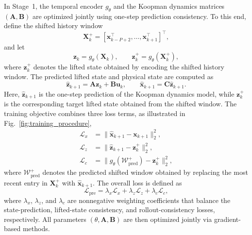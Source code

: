 \documentclass[journal]{IEEEtran}
\newcommand{\vx}{\mathbf{x}}
\newcommand{\vu}{\mathbf{u}}
\newcommand{\vz}{\mathbf{z}}
\newcommand{\mA}{\mathbf{A}}
\newcommand{\mB}{\mathbf{B}}
\newcommand{\mC}{\mathbf{C}}
\newcommand{\mX}{\mathbf{X}}
\begin{document}
In Stage~1, the temporal encoder $g_\theta$ and the Koopman dynamics matrices $(\mA,\mB)$ are optimized jointly using one-step prediction consistency. To this end, define the shifted history window
\begin{equation}
    \mX_k^{+} = [\vx_{k-P+2}^\top,\ldots,\vx_{k+1}^\top]^\top,
\end{equation}
and let
\begin{equation}
    \vz_k = g_\theta(\mX_k), \qquad
    \vz_k^{+} = g_\theta(\mX_k^{+}),
\end{equation}
where $\vz_k^{+}$ denotes the lifted state obtained by encoding the shifted history window. The predicted lifted state and physical state are computed as
\begin{equation}
    \hat{\vz}_{k+1} = \mA \vz_k + \mB \vu_k,
    \qquad
    \hat{\vx}_{k+1} = \mC \hat{\vz}_{k+1}.
\end{equation}
Here, $\hat{\vz}_{k+1}$ is the one-step prediction of the Koopman dynamics model, while $\vz_k^{+}$ is the corresponding target lifted state obtained from the shifted window. The training objective combines three loss terms, as illustrated in Fig.~\ref{fig:training_procedure},
\begin{align}
    \mathcal{L}_{x} &= \|\hat{\vx}_{k+1}-\vx_{k+1}\|_2^2,
    \label{eq:loss_x}\\
    \mathcal{L}_{z} &= \|\hat{\vz}_{k+1}-\vz_k^{+}\|_2^2,
    \label{eq:loss_z}\\
    \mathcal{L}_{c} &=
    \bigl\|g_\theta(\mathcal{W}^{+}_{\mathrm{pred}})-\vz_k^{+}\bigr\|_2^2,
    \label{eq:loss_c}
\end{align}
where $\mathcal{W}^{+}_{\mathrm{pred}}$ denotes the predicted shifted window obtained by replacing the most recent entry in $\mX_k^{+}$ with $\hat{\vx}_{k+1}$. The overall loss is defined as
\begin{equation}
    \mathcal{L}_{\mathrm{pre}} =
    \lambda_x \mathcal{L}_x + \lambda_z \mathcal{L}_z
    + \lambda_c \mathcal{L}_c,
    \label{eq:pretraining_loss}
\end{equation}
where $\lambda_x$, $\lambda_z$, and $\lambda_c$ are nonnegative weighting coefficients that balance the state-prediction, lifted-state consistency, and rollout-consistency losses, respectively. All parameters $(\theta, \mA, \mB)$ are then optimized jointly via gradient-based methods.
\end{document}
